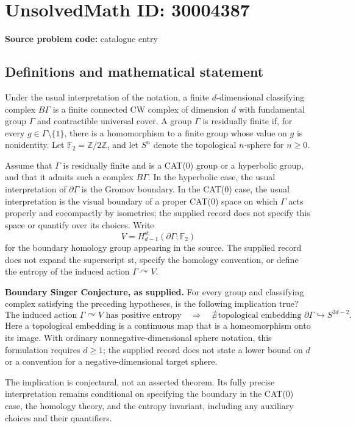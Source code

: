 \documentclass[11pt]{article}
\newcommand{\Z}{\mathbb{Z}}
\newcommand{\F}{\mathbb{F}}
\begin{document}
\section*{UnsolvedMath ID: 30004387}
\textbf{Source problem code:} catalogue entry
\subsection{Definitions and mathematical statement}
Under the usual interpretation of the notation, a finite \(d\)-dimensional classifying complex \(B\Gamma\) is a finite connected CW complex of dimension \(d\) with fundamental group \(\Gamma\) and contractible universal cover. A group \(\Gamma\) is residually finite if, for every \(g\in\Gamma\setminus\{1\}\), there is a homomorphism to a finite group whose value on \(g\) is nonidentity. Let \(\F_2=\Z/2\Z\), and let \(S^n\) denote the topological \(n\)-sphere for \(n\geq 0\).

Assume that \(\Gamma\) is residually finite and is a CAT(0) group or a hyperbolic group, and that it admits such a complex \(B\Gamma\). In the hyperbolic case, the usual interpretation of \(\partial\Gamma\) is the Gromov boundary. In the CAT(0) case, the usual interpretation is the visual boundary of a proper CAT(0) space on which \(\Gamma\) acts properly and cocompactly by isometries; the supplied record does not specify this space or quantify over its choices. Write
\[
V=H^{\mathrm{st}}_{d-1}(\partial\Gamma;\F_2)
\]
for the boundary homology group appearing in the source. The supplied record does not expand the superscript \(\mathrm{st}\), specify the homology convention, or define the entropy of the induced action \(\Gamma\curvearrowright V\).

\textbf{Boundary Singer Conjecture, as supplied.} For every group and classifying complex satisfying the preceding hypotheses, is the following implication true?
\[
\text{The induced action }\Gamma\curvearrowright V
\text{ has positive entropy}
\quad\Longrightarrow\quad
\nexists\,\text{topological embedding }
\partial\Gamma\hookrightarrow S^{2d-2}.
\]
Here a topological embedding is a continuous map that is a homeomorphism onto its image. With ordinary nonnegative-dimensional sphere notation, this formulation requires \(d\geq 1\); the supplied record does not state a lower bound on \(d\) or a convention for a negative-dimensional target sphere.

The implication is conjectural, not an asserted theorem. Its fully precise interpretation remains conditional on specifying the boundary in the CAT(0) case, the homology theory, and the entropy invariant, including any auxiliary choices and their quantifiers.
\end{document}

